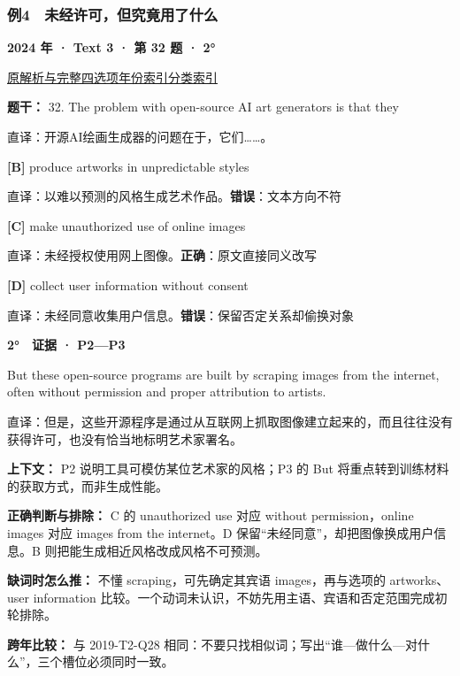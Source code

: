 \documentclass[11pt,a4paper]{article}
\begin{document}
\subsubsection{例4　未经许可，但究竟用了什么}\label{case-2024-T3-Q32}
\noindent\textbf{2024 年 · Text 3 · 第 32 题 · 2°}\par\noindent \href{https://zj139.github.io/math-notes/english/45e4c8a550f2be01daf2d7ac/\#q32}{原解析与完整四选项}\quad \hyperref[idx-2024-T3-Q32]{年份索引}\quad \hyperref[class-R02]{分类索引}\par\smallskip
\noindent\textbf{题干：} 32. The problem with open-source AI art generators is that they\par\smallskip
直译：开源AI绘画生成器的问题在于，它们……。

\noindent\textbf{[B]} produce artworks in unpredictable styles\par\nopagebreak
\noindent 直译：以难以预测的风格生成艺术作品。\quad\textbf{错误}：文本方向不符\par\smallskip
{}\noindent\textbf{[C]} make unauthorized use of online images\par\nopagebreak
\noindent 直译：未经授权使用网上图像。\quad\textbf{正确}：原文直接同义改写\par\smallskip
{}\noindent\textbf{[D]} collect user information without consent\par\nopagebreak
\noindent 直译：未经同意收集用户信息。\quad\textbf{错误}：保留否定关系却偷换对象\par\smallskip
\begin{evidence}\textbf{2°　证据 · P2—P3}\par But these open-source programs are built by scraping images from the internet, often without permission and proper attribution to artists.\par 直译：但是，这些开源程序是通过从互联网上抓取图像建立起来的，而且往往没有获得许可，也没有恰当地标明艺术家署名。\end{evidence}
\noindent\textbf{上下文：} P2 说明工具可模仿某位艺术家的风格；P3 的 But 将重点转到训练材料的获取方式，而非生成性能。\par\smallskip
\noindent\textbf{正确判断与排除：} C 的 unauthorized use 对应 without permission，online images 对应 images from the internet。D 保留“未经同意”，却把图像换成用户信息。B 则把能生成相近风格改成风格不可预测。\par\smallskip
\noindent\textbf{缺词时怎么推：} 不懂 scraping，可先确定其宾语 images，再与选项的 artworks、user information 比较。一个动词未认识，不妨先用主语、宾语和否定范围完成初轮排除。\par\smallskip
\noindent\textbf{跨年比较：} 与 2019-T2-Q28 相同：不要只找相似词；写出“谁—做什么—对什么”，三个槽位必须同时一致。\par\smallskip
\clearpage
\end{document}
